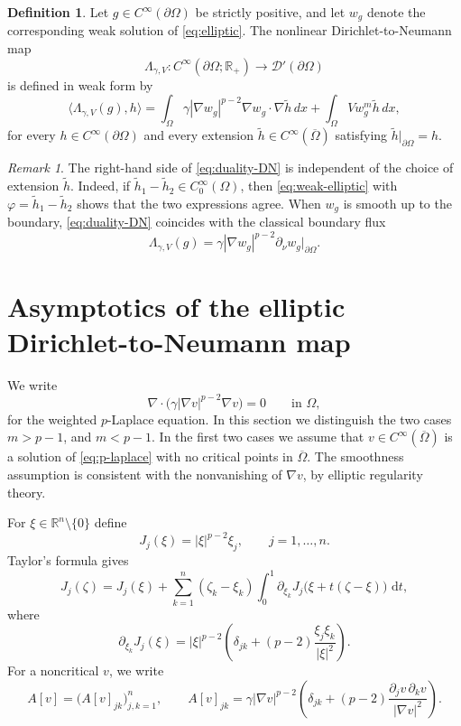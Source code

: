 \documentclass[a4paper,12pt]{article}
\newcommand{\la}{\langle}
\newcommand{\ra}{\rangle}
\newcommand{\pr}{\partial}
\newcommand{\R}{\mathbb{R}}
\newcommand{\dd}{\,\mathrm{d}}
\theoremstyle{definition}
\newtheorem{dfn}[thm]{Definition}
\theoremstyle{remark}
\newtheorem{rem}[thm]{Remark}
\begin{document}
\begin{dfn}\label{def:DN}
Let $g\in C^\infty(\pr\Omega)$ be strictly positive, and let $w_g$ denote the corresponding weak solution of \eqref{eq:elliptic}. The nonlinear Dirichlet-to-Neumann map
\[
\Lambda_{\gamma,V}:C^\infty(\pr\Omega;\R_+)\to \mathcal D'(\pr\Omega)
\]
is defined in weak form by
\begin{equation}\label{eq:duality-DN}
\la \Lambda_{\gamma,V}(g),h\ra
=
\int_\Omega \gamma|\nabla w_g|^{p-2}\nabla w_g\cdot\nabla\widetilde h\,dx
+\int_\Omega Vw_g^m\widetilde h\,dx,
\end{equation}
for every $h\in C^\infty(\pr\Omega)$ and every extension $\widetilde h\in C^\infty(\overline\Omega)$ satisfying $\widetilde h|_{\pr\Omega}=h$.
\end{dfn}

\begin{rem}
The right-hand side of \eqref{eq:duality-DN} is independent of the choice of extension $\widetilde h$. Indeed, if $\widetilde h_1-\widetilde h_2\in C^\infty_0(\Omega)$, then \eqref{eq:weak-elliptic} with $\varphi=\widetilde h_1-\widetilde h_2$ shows that the two expressions agree. When $w_g$ is smooth up to the boundary, \eqref{eq:duality-DN} coincides with the classical boundary flux
\[
\Lambda_{\gamma,V}(g)=\gamma|\nabla w_g|^{p-2}\partial_\nu w_g\big|_{\pr\Omega}.
\]
\end{rem}

\section{Asymptotics of the elliptic Dirichlet-to-Neumann map}\label{sec:asymptotics}

We write
\begin{equation}\label{eq:p-laplace}
\nabla\cdot\bigl(\gamma|\nabla v|^{p-2}\nabla v\bigr)=0
\qquad \text{in }\Omega,
\end{equation}
for the weighted $p$-Laplace equation. In this section we distinguish the two cases $m>p-1$, and $m<p-1$. In the first two cases we assume that $v\in C^\infty(\overline\Omega)$ is a solution of \eqref{eq:p-laplace} with no critical points in $\overline\Omega$. The smoothness assumption is consistent with the nonvanishing of $\nabla v$, by elliptic regularity theory.

For $\xi\in\R^n\setminus\{0\}$ define
\[
J_j(\xi)=|\xi|^{p-2}\xi_j,
\qquad j=1,\dots,n.
\]
Taylor's formula gives
\begin{equation}\label{eq:Taylor-J}
J_j(\zeta)=J_j(\xi)+\sum_{k=1}^n(\zeta_k-\xi_k)\int_0^1 \partial_{\xi_k}J_j\bigl(\xi+t(\zeta-\xi)\bigr)\,\dd t,
\end{equation}
where
\begin{equation}\label{eq:J-derivative}
\pr_{\xi_k}J_j(\xi)=|\xi|^{p-2}\left(\delta_{jk}+(p-2)\frac{\xi_j\xi_k}{|\xi|^2}\right).
\end{equation}
For a noncritical $v$, we write
\begin{equation}\label{eq:A-v}
A[v]=\bigl(A[v]_{jk}\bigr)_{j,k=1}^n,
\qquad
A[v]_{jk}=\gamma|\nabla v|^{p-2}\left(\delta_{jk}+(p-2)\frac{\pr_jv\,\pr_kv}{|\nabla v|^2}\right).
\end{equation}
\end{document}
